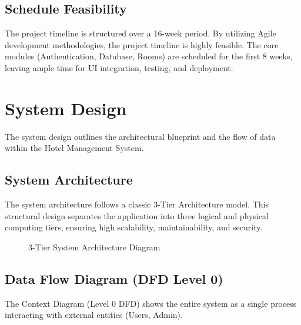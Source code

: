 \documentclass[12pt,a4paper]{article}
\begin{document}
\subsection{Schedule Feasibility}
The project timeline is structured over a 16-week period. By utilizing Agile development methodologies, the project timeline is highly feasible. The core modules (Authentication, Database, Rooms) are scheduled for the first 8 weeks, leaving ample time for UI integration, testing, and deployment.

\newpage
\section{System Design}
The system design outlines the architectural blueprint and the flow of data within the Hotel Management System.

\subsection{System Architecture}
The system architecture follows a classic 3-Tier Architecture model. This structural design separates the application into three logical and physical computing tiers, ensuring high scalability, maintainability, and security.

\begin{figure}[H]
\centering
{}
\caption{3-Tier System Architecture Diagram}
\end{figure}

\subsection{Data Flow Diagram (DFD Level 0)}
The Context Diagram (Level 0 DFD) shows the entire system as a single process interacting with external entities (Users, Admin).
\end{document}
